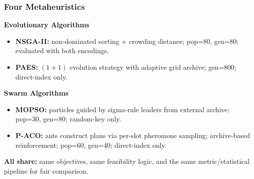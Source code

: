 \documentclass[aspectratio=169,10pt]{beamer}
\begin{document}
\begin{frame}
\frametitle{Four Metaheuristics}

\textbf{Evolutionary Algorithms}
\begin{itemize}
  \item \textbf{NSGA-II:} non-dominated sorting + crowding distance; pop=80, gen=80; evaluated with both encodings.
  \item \textbf{PAES:} $(1{+}1)$ evolution strategy with adaptive grid archive; gen=800; direct-index only.
\end{itemize}

\textbf{Swarm Algorithms}
\begin{itemize}
  \item \textbf{MOPSO:} particles guided by sigma-rule leaders from external archive; pop=30, gen=80; random-key only.
  \item \textbf{P-ACO:} ants construct plans via per-slot pheromone sampling; archive-based reinforcement; pop=60, gen=40; direct-index only.
\end{itemize}

\vspace{0.3cm}

\textbf{All share:} same objectives, same feasibility logic, and the same metric/statistical pipeline for fair comparison.

\end{frame}
\end{document}

